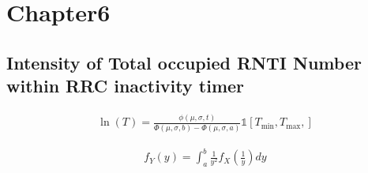 \chapter{Chapter6}
\section*{Intensity of Total occupied RNTI Number within RRC inactivity timer}
\begin{align}
	\ln (T) = \frac{\phi(\mu, \sigma, t)}{\Phi(\mu, \sigma, b) - \Phi(\mu, \sigma, a)} \mathds{1}\left[ T_{\text{min}}, T_{\text{max}},\right] 
\end{align}

\begin{align}
	f_Y(y) = \int_{a}^{b} \frac{1}{y^2} f_X(\frac{1}{y}) dy
\end{align}

